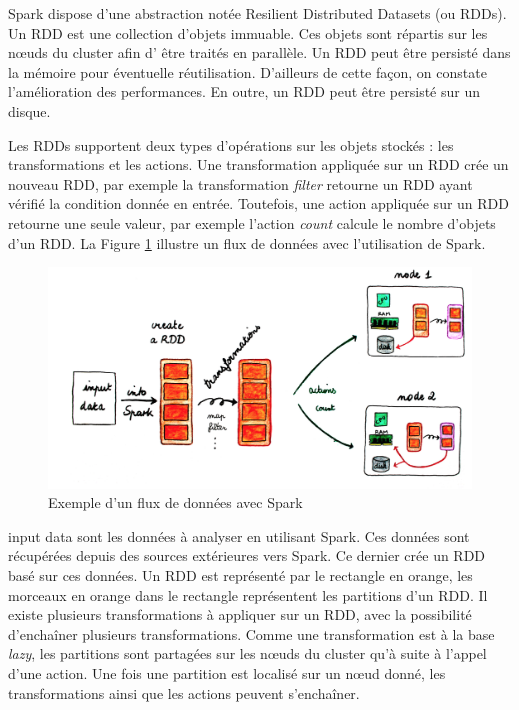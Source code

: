 Spark dispose d'une abstraction notée Resilient Distributed Datasets (ou RDDs). Un RDD est une collection d'objets immuable. Ces objets sont répartis sur les n\oe{}uds du cluster afin d' être traités en parallèle. Un RDD peut être persisté dans la mémoire pour éventuelle réutilisation.   D'ailleurs de cette façon, on constate l'amélioration des performances. En outre, un RDD peut être persisté sur un disque. 

Les RDDs supportent deux types d'opérations sur les objets stockés : les transformations et les actions. Une  transformation appliquée sur un RDD crée un nouveau RDD, par exemple la transformation \textit{filter} retourne un RDD ayant vérifié la condition donnée en entrée.  Toutefois, une action appliquée sur un RDD retourne une seule valeur, par exemple l'action \textit{count} calcule le nombre d'objets d'un RDD. La Figure 	\ref{fig:globalviewrdd} illustre un flux de données avec l'utilisation de Spark. 

\begin{figure}[H]
	\centering
	\captionsetup{justification= centering}
	\includegraphics[width=0.7\linewidth]{illustrations/global_view_rdd}
	\caption{Exemple d'un flux de données avec Spark}
	\label{fig:globalviewrdd}
\end{figure}

input data sont les données à analyser en utilisant Spark. Ces données sont récupérées depuis des sources extérieures vers Spark. Ce dernier crée un RDD basé sur ces données. Un RDD est représenté par le rectangle en orange, les morceaux en orange dans le rectangle représentent les partitions d'un RDD. 
Il existe plusieurs transformations à appliquer sur un RDD, avec la possibilité d'enchaîner plusieurs transformations. Comme une transformation est à la base  \textit{lazy}, les partitions sont partagées sur les n\oe{}uds du cluster qu'à suite à l'appel d'une action. Une fois une partition est localisé sur un n\oe{}ud donné, les transformations ainsi que les actions peuvent s'enchaîner.

